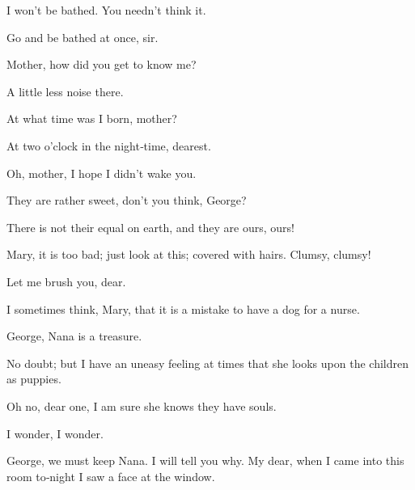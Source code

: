 \begin{drama}
I won’t be bathed.
You needn’t think it.

Go and be bathed at once, sir.


Mother, how did you get to know me?

\mrdarlingspeaks
A little less noise there.

At what time was I born, mother?

\mrsdarlingspeaks
At two o’clock in the night‐time, dearest.

\michaelspeaks
Oh, mother, I hope I didn’t wake you.

\mrsdarlingspeaks
They are rather sweet, don’t you think, George?

There is not their equal on earth, and they are ours, ours!


\mrdarlingspeaks
Mary, it is too bad; just look at this; covered with hairs.
Clumsy, clumsy!


\mrsdarlingspeaks
Let me brush you, dear.


I sometimes think, Mary, that it is a mistake to have a dog for a nurse.

\mrsdarlingspeaks
George, Nana is a treasure.

\mrdarlingspeaks
No doubt; but I have an uneasy feeling at times that she looks upon the children as puppies.

Oh no, dear one, I am sure she knows they have souls.

I wonder, I wonder.


\mrsdarlingspeaks
George, we must keep Nana.
I will tell you why.
My dear, when I came into this room to‐night I saw a face at the window.


\end{drama}
